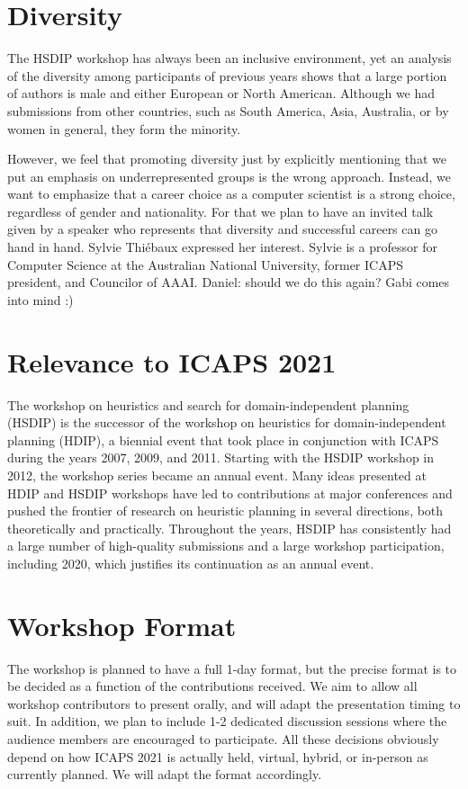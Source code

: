 \documentclass[10pt]{article}
\begin{document}
\section*{Diversity}
The HSDIP workshop has always been an inclusive environment, yet an analysis
of the diversity among participants of previous years shows that a large portion
of authors is male and either European or North American. Although we had
submissions from other countries, such as South America, Asia, Australia, or
by women in general, they form the minority.

However, we feel that promoting diversity just by explicitly mentioning that we
put an emphasis on underrepresented groups is the wrong approach. Instead, we
want to emphasize that a career choice as a computer scientist is a strong choice,
regardless of gender and nationality. For that we plan to have an invited talk
given by a speaker who represents that diversity and successful careers can go
hand in hand. Sylvie Thi{\'e}baux expressed her interest. Sylvie is a professor
for Computer Science at the Australian National University, former ICAPS
president, and Councilor of AAAI.
{\color{red} Daniel: should we do this again? Gabi comes into mind :)}

\section*{Relevance to ICAPS 2021}

The workshop on heuristics and search for domain-independent planning (HSDIP) is
the successor of the workshop on heuristics for domain-independent planning
(HDIP), a biennial event that took place in conjunction with ICAPS during the
years 2007, 2009, and 2011. Starting with the HSDIP workshop in 2012, the
workshop series became an annual event.
Many ideas presented at HDIP and HSDIP workshops have led to contributions at
major conferences and pushed the frontier of research on heuristic planning in
several directions, both theoretically and practically.
Throughout the years, HSDIP has consistently had a large number of
high-quality submissions and a large workshop participation, including 2020,
which justifies its continuation as an annual event.

\section*{Workshop Format}

The workshop is planned to have a full 1-day format, but the precise
format is to be decided as a function of the contributions received.
We aim to allow all workshop contributors to present orally, and will
adapt the presentation timing to suit. In addition, we plan to include
1-2 dedicated discussion sessions where the audience members are
encouraged to participate. All these decisions obviously depend on how ICAPS 2021
is actually held, virtual, hybrid, or in-person as currently planned. We
will adapt the format accordingly.
\end{document}
